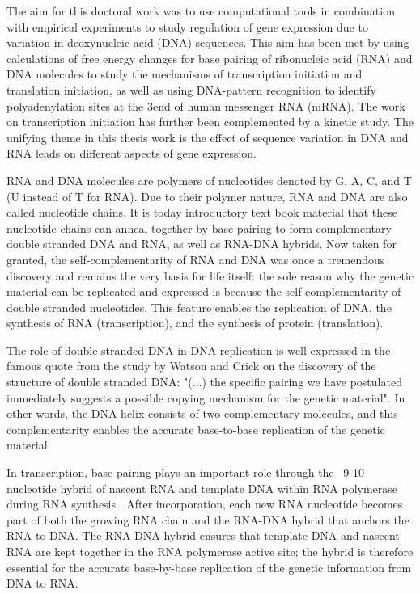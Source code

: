 %
The aim for this doctoral work was to use computational tools in combination
with empirical experiments to study regulation of gene expression due to
variation in deoxynucleic acid (DNA) sequences. This aim has been met by using
calculations of free energy changes for base pairing of ribonucleic acid (RNA)
and DNA molecules to study the mechanisms of transcription initiation and
translation initiation, as well as using DNA-pattern recognition to identify
polyadenylation sites at the 3\ppp end of human messenger RNA (mRNA). The work
on transcription initiation has further been complemented by a kinetic study.
The unifying theme in this thesis work is the effect of sequence variation in
DNA and RNA leads on different aspects of gene expression.

RNA and DNA molecules are polymers of nucleotides denoted by G, A, C, and T (U
instead of T for RNA). Due to their polymer nature, RNA and DNA are also called
nucleotide chains. It is today introductory text book material that these
nucleotide chains can anneal together by base pairing to form complementary
double stranded DNA and RNA, as well as RNA-DNA hybrids. Now taken for
granted, the self-complementarity of RNA and DNA was once a tremendous
discovery and remains the very basis for life itself: the sole reason why the
genetic material can be replicated and expressed is because the
self-complementarity of double stranded nucleotides. This feature enables the
replication of DNA, the synthesis of RNA (transcription), and the synthesis of
protein (translation).

The role of double stranded DNA in DNA replication is well expressed in the
famous quote from the study by Watson and Crick \cite{watson_molecular_1953} on
the discovery of the structure of double stranded DNA: "(...) the specific
pairing we have postulated immediately suggests a possible copying mechanism
for the genetic material". In other words, the DNA helix consists of two
complementary molecules, and this complementarity enables the accurate
base-to-base replication of the genetic material.

In transcription, base pairing plays an important role through the ~9-10
nucleotide hybrid of nascent RNA and template DNA within RNA polymerase during
RNA synthesis \cite{vassylyev_structural_2007}. After incorporation, each new
RNA nucleotide becomes part of both the growing RNA chain and the RNA-DNA
hybrid that anchors the RNA to DNA. The RNA-DNA hybrid ensures that template
DNA and nascent RNA are kept together in the RNA polymerase active site; the
hybrid is therefore essential for the accurate base-by-base replication of the
genetic information from DNA to RNA.

